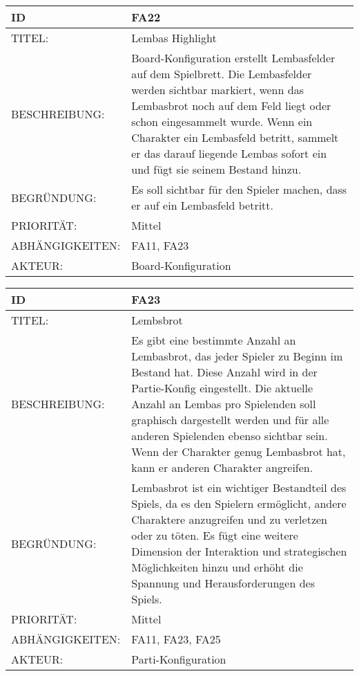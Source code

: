 \documentclass{uulm-assignment}
\begin{document}
    \begin{tabularx}{\textwidth}{|l|X |} \hline
        \textbf{ID} & \textbf{FA22} \\
        \hline
        TITEL: &  Lembas Highlight\\
        \hline
        BESCHREIBUNG: & Board-Konfiguration erstellt Lembasfelder auf dem Spielbrett. Die Lembasfelder werden sichtbar markiert, wenn das Lembasbrot noch auf dem Feld liegt oder schon eingesammelt wurde.  Wenn ein Charakter ein Lembasfeld betritt, sammelt er das darauf liegende Lembas sofort ein und fügt sie seinem Bestand hinzu.
        \\
        \hline
        BEGRÜNDUNG: & Es soll sichtbar für den Spieler machen, dass er auf ein Lembasfeld betritt.\\
        \hline
        PRIORITÄT: & Mittel\\
        \hline
        ABHÄNGIGKEITEN: & FA11, FA23 \\
        \hline
        AKTEUR: & Board-Konfiguration \\
        \hline
    \end{tabularx}
    
    \begin{tabularx}{\textwidth}{|l|X |} \hline
        \textbf{ID} & \textbf{FA23} \\
        \hline
        TITEL: &  Lembsbrot\\
        \hline
        BESCHREIBUNG: & Es gibt eine bestimmte Anzahl an Lembasbrot, das jeder Spieler zu Beginn im Bestand hat. Diese Anzahl wird in der Partie-Konfig eingestellt. Die aktuelle Anzahl an Lembas pro Spielenden soll graphisch dargestellt werden und für alle anderen Spielenden ebenso sichtbar sein.  Wenn der Charakter genug Lembasbrot hat, kann er anderen Charakter angreifen.
        \\
        \hline
        BEGRÜNDUNG: &  Lembasbrot ist ein wichtiger Bestandteil des Spiels, da es den Spielern ermöglicht, andere Charaktere anzugreifen und zu verletzen oder zu töten. Es fügt eine weitere Dimension der Interaktion und strategischen Möglichkeiten hinzu und erhöht die Spannung und Herausforderungen des Spiels.\\
        \hline
        PRIORITÄT: & Mittel\\
        \hline
        ABHÄNGIGKEITEN: & FA11, FA23, FA25\\
        \hline
        AKTEUR: & Parti-Konfiguration\\
        \hline
    \end{tabularx}
    
\end{document}
